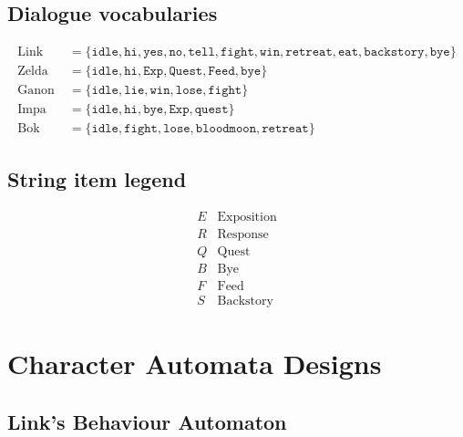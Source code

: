 \documentclass{article}
\begin{document}
\subsection*{Dialogue vocabularies}

\[
\begin{aligned}

\text{Link}\; &= \{\texttt{idle},\texttt{hi},\texttt{yes},\texttt{no},\texttt{tell},\texttt{fight},\texttt{win},\texttt{retreat},\texttt{eat},\texttt{backstory},\texttt{bye}\}\\[4pt]

\text{Zelda}\; &= \{\texttt{idle},\texttt{hi},\texttt{Exp},\texttt{Quest},\texttt{Feed},\texttt{bye}\}\\[4pt]

\text{Ganon}\; &= \{\texttt{idle},\texttt{lie},\texttt{win},\texttt{lose},\texttt{fight}\}\\[4pt]

\text{Impa}\; &= \{\texttt{idle},\texttt{hi},\texttt{bye},\texttt{Exp},\texttt{quest}\}\\[4pt]

\text{Bok}\; &= \{\texttt{idle},\texttt{fight},\texttt{lose},\texttt{bloodmoon},\texttt{retreat}\}

\end{aligned}
\]
\subsection*{String item legend}

\[
\begin{array}{ll}
E & \text{Exposition}\\
R & \text{Response}\\
Q & \text{Quest}\\
B & \text{Bye}\\
F & \text{Feed}\\
S & \text{Backstory}
\end{array}
\]

\section*{Character Automata Designs}

\subsection*{Link's Behaviour Automaton}
\end{document}
